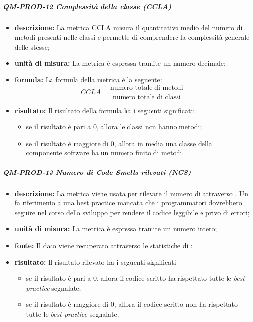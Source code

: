 			\subparagraph{QM-PROD-12 Complessità della classe (CCLA)}
			\begin{itemize}
      			\item \textbf{descrizione: }
					La metrica CCLA misura il quantitativo medio del numero di metodi presenti nelle classi e permette di comprendere la complessità generale delle stesse;
				\item \textbf{unità di misura: }
					La metrica è espressa tramite un numero decimale;
				\item \textbf{formula: }
					La formula della metrica è la seguente:
					\[
				 		CCLA = \frac{\text{numero totale di metodi}}{\text{numero totale di classi}}
				 	\]
				\item \textbf{risultato: }
					Il risultato della formula ha i seguenti significati:
					\begin{itemize}
						\item se il risultato è pari a 0, allora le classi non hanno metodi;
						\item se il risultato è maggiore di 0, allora in media una classe della componente software ha un numero finito di metodi.
					\end{itemize}
			\end{itemize}
			\subparagraph{QM-PROD-13 Numero di Code Smells rilevati (NCS)}
			\begin{itemize}
      			\item \textbf{descrizione: }
					La metrica viene usata per rilevare il numero di  attraverso . Un  fa riferimento a una best practice mancata che i programmatori dovrebbero seguire nel corso dello sviluppo per rendere il codice leggibile e privo di errori;
				\item \textbf{unità di misura: }
					La metrica è espressa tramite un numero intero;
				\item \textbf{fonte: }
					Il dato viene recuperato attraverso le statistiche di ;
				\item \textbf{risultato: }
					Il risultato rilevato ha i seguenti significati:
					\begin{itemize}
						\item se il risultato è pari a 0, allora il codice scritto ha rispettato tutte le \textit{best practice} segnalate;
						\item se il risultato è maggiore di 0, allora il codice scritto non ha rispettato tutte le \textit{best practice} segnalate.
					\end{itemize}
			\end{itemize}

